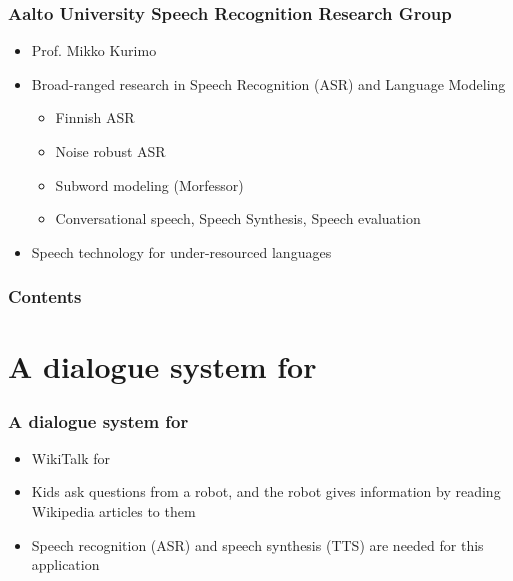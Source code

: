 %
\begin{frame}
\frametitle{Aalto University Speech Recognition Research Group}
\begin{itemize}
\item Prof. Mikko Kurimo
\item Broad-ranged research in Speech Recognition (ASR) and Language Modeling
\begin{itemize}
\item Finnish ASR
\item Noise robust ASR
\item Subword modeling (Morfessor)
\item Conversational speech, Speech Synthesis, Speech evaluation
\end{itemize}

\item Speech technology for under-resourced languages
\end{itemize}
\end{frame}


\begin{frame}
\frametitle{Contents}
\tableofcontents
\end{frame}





\section{A dialogue system for \ns}
\begin{frame}
\frametitle{A dialogue system for \ns}
\begin{itemize}
\item WikiTalk for \ns
\item Kids ask questions from a robot, and the robot gives information by reading Wikipedia articles to them
\item Speech recognition (ASR) and speech synthesis (TTS) are needed for this application
\end{itemize}
\end{frame}

